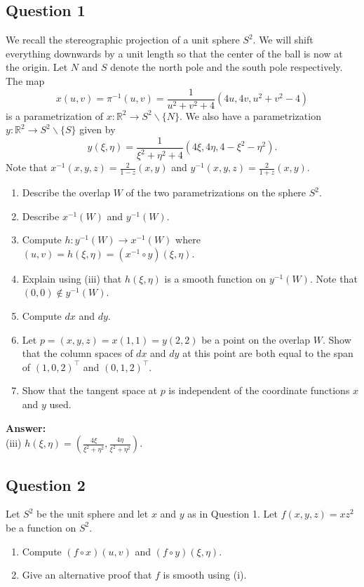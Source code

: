 \documentclass[12pt, a4paper]{article}
\newcommand{\R}{\mathbb{R}}
\begin{document}
\subsection*{Question 1}
We recall the stereographic projection of a unit sphere $S^{2}$. We will shift everything downwards by a unit length so that the center of the ball is now at the origin. Let $N$ and $S$ denote the north pole and the south pole respectively. The map
\[ x(u,v)=\pi^{-1}(u,v)=\frac{1}{u^{2}+v^{2}+4}(4u,4v,u^{2}+v^{2}-4) \]
is a parametrization of $x:\R^{2}\rightarrow S^{2}\backslash\{N\}$. We also have a parametrization $y: \R^{2}\rightarrow S^{2}\backslash\{S\}$ given by
\[ y(\xi,\eta)=\frac{1}{\xi^{2}+\eta^{2}+4}(4\xi,4\eta,4-\xi^{2}-\eta^{2}). \]
Note that $x^{-1}(x,y,z)=\frac{2}{1-z}(x,y)$ and $y^{-1}(x,y,z)=\frac{2}{1+z}(x,y)$.
\begin{enumerate}[label=(\roman*)]
    \item Describe the overlap $W$ of the two parametrizations on the sphere $S^{2}$.
    \item Describe $x^{-1}(W)$ and $y^{-1}(W)$.
    \item Compute $h:y^{-1}(W)\rightarrow x^{-1}(W)$ where $(u,v)=h(\xi,\eta)=(x^{-1}\circ y)(\xi,\eta)$.
    \item Explain using (iii) that $h(\xi,\eta)$ is a smooth function on $y^{-1}(W)$. Note that $(0,0)\notin y^{-1}(W)$.
    \item Compute $dx$ and $dy$.
    \item Let $p=(x,y,z)=x(1,1)=y(2,2)$ be a point on the overlap $W$. Show that the column spaces of $dx$ and $dy$ at this point are both equal to the span of $(1,0,2)^{\top}$ and $(0,1,2)^{\top}$.
    \item Show that the tangent space at $p$ is independent of the coordinate functions $x$ and $y$ used.
\end{enumerate}

\vspace{1em}
\noindent\textbf{Answer:}\\
(iii) $h(\xi,\eta)=(\frac{4\xi}{\xi^{2}+\eta^{2}},\frac{4\eta}{\xi^{2}+\eta^{2}})$.
\newpage

\subsection*{Question 2}
Let $S^{2}$ be the unit sphere and let $x$ and $y$ as in Question 1. Let $f(x,y,z)=xz^{2}$ be a function on $S^{2}$.
\begin{enumerate}[label=(\roman*)]
    \item Compute $(f\circ x)(u,v)$ and $(f\circ y)(\xi,\eta)$.
    \item Give an alternative proof that $f$ is smooth using (i).
\end{enumerate}
\newpage
\end{document}

